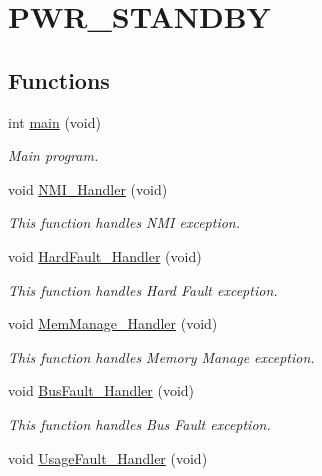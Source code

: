 \hypertarget{group___p_w_r___s_t_a_n_d_b_y}{\section{P\-W\-R\-\_\-\-S\-T\-A\-N\-D\-B\-Y}
\label{group___p_w_r___s_t_a_n_d_b_y}
}
\subsection*{Functions}
\begin{DoxyCompactItemize}
\item 
int \hyperlink{group___p_w_r___s_t_a_n_d_b_y_ga840291bc02cba5474a4cb46a9b9566fe}{main} (void)
\begin{DoxyCompactList}\small\item\em Main program. \end{DoxyCompactList}\item 
void \hyperlink{group___p_w_r___s_t_a_n_d_b_y_ga6ad7a5e3ee69cb6db6a6b9111ba898bc}{N\-M\-I\-\_\-\-Handler} (void)
\begin{DoxyCompactList}\small\item\em This function handles N\-M\-I exception. \end{DoxyCompactList}\item 
void \hyperlink{group___p_w_r___s_t_a_n_d_b_y_ga2bffc10d5bd4106753b7c30e86903bea}{Hard\-Fault\-\_\-\-Handler} (void)
\begin{DoxyCompactList}\small\item\em This function handles Hard Fault exception. \end{DoxyCompactList}\item 
void \hyperlink{group___p_w_r___s_t_a_n_d_b_y_ga3150f74512510287a942624aa9b44cc5}{Mem\-Manage\-\_\-\-Handler} (void)
\begin{DoxyCompactList}\small\item\em This function handles Memory Manage exception. \end{DoxyCompactList}\item 
void \hyperlink{group___p_w_r___s_t_a_n_d_b_y_ga850cefb17a977292ae5eb4cafa9976c3}{Bus\-Fault\-\_\-\-Handler} (void)
\begin{DoxyCompactList}\small\item\em This function handles Bus Fault exception. \end{DoxyCompactList}\item 
void \hyperlink{group___p_w_r___s_t_a_n_d_b_y_ga1d98923de2ed6b7309b66f9ba2971647}{Usage\-Fault\-\_\-\-Handler} (void)

\end{DoxyCompactItemize}
